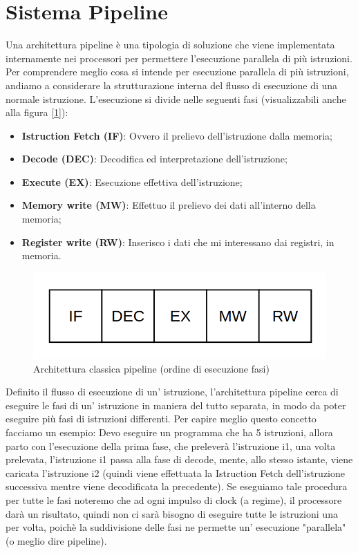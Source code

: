 \newpage
\section{Sistema Pipeline}
Una architettura pipeline è una tipologia di soluzione che viene implementata internamente nei processori per permettere l'esecuzione parallela di più istruzioni.
Per comprendere meglio cosa si intende per esecuzione parallela di più istruzioni, andiamo a considerare la strutturazione interna del flusso di esecuzione di una normale istruzione. L'esecuzione si divide nelle seguenti fasi (visualizzabili anche alla figura [\ref{img:pipe}]):
\begin{itemize}
    \item \textbf{Istruction Fetch (IF)}: Ovvero il prelievo dell'istruzione dalla memoria;
    \item \textbf{Decode (DEC)}: Decodifica ed interpretazione dell'istruzione;
    \item \textbf{Execute (EX)}: Esecuzione effettiva dell'istruzione;
    \item \textbf{Memory write (MW)}: Effettuo il prelievo dei dati all'interno della memoria;
    \item \textbf{Register write (RW)}: Inserisco i dati che mi interessano dai registri, in memoria. 
\end{itemize}

\begin{figure}
    \centering
    \includegraphics[width=.5\textwidth]{img/Pipeline.png}
    \caption{Architettura classica pipeline (ordine di esecuzione fasi)}\label{img:pipe}
\end{figure}

Definito il flusso di esecuzione di un' istruzione, l'architettura pipeline cerca di eseguire le fasi di un' istruzione in maniera del tutto separata, in modo da poter eseguire più fasi di istruzioni differenti. Per capire meglio questo concetto facciamo un esempio:
Devo eseguire un programma che ha 5 istruzioni, allora parto con l'esecuzione della prima fase, che preleverà l'istruzione i1, una volta prelevata, l'istruzione i1 passa alla fase di decode, mente, allo stesso istante, viene caricata l'istruzione i2 (quindi viene effettuata la Istruction Fetch dell'istruzione successiva mentre viene decodificata la precedente). Se eseguiamo tale procedura per tutte le fasi noteremo che ad ogni impulso di clock (a regime), il processore darà un risultato, quindi non ci sarà bisogno di eseguire tutte le istruzioni una per volta, poichè la suddivisione delle fasi ne permette un' esecuzione "parallela" (o meglio dire pipeline).

